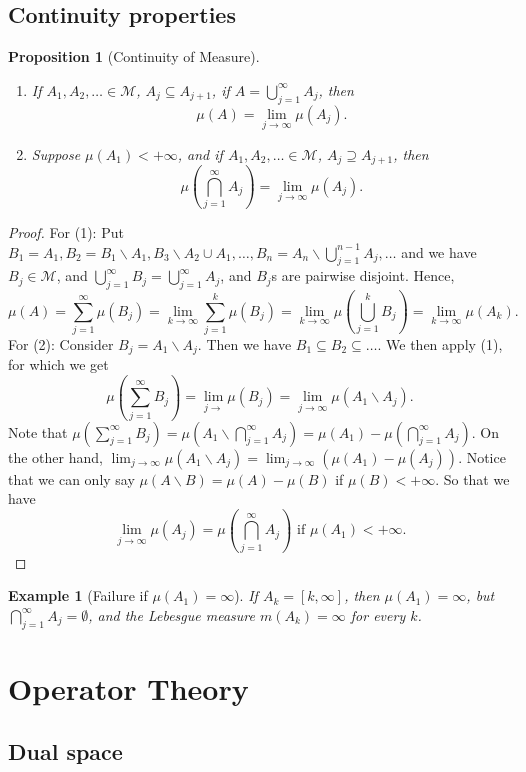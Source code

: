 \documentclass{tufte-handout}
\newtheorem{proposition}{Proposition}[section]
\newtheorem{example}{Example}[section]
\begin{document}
\subsection{Continuity properties}
\begin{proposition}[Continuity of Measure]
    \mbox{}
    \begin{enumerate}
        \item If $A_1, A_2, \dots \in \mathcal{M}$, $A_j \subseteq A_{j+1}$, if $A = \bigcup^{\infty}_{j=1} A_j$, then 
        \[
        \mu(A) = \lim_{j\rightarrow \infty} \mu(A_j).
        \]
        \item  Suppose $\mu(A_1) < +\infty$, and if $A_1, A_2, \dots \in \mathcal{M}$, $A_j \supseteq A_{j+1}$, then 
        \[
        \mu(\bigcap^{\infty}_{j=1} A_j) = \lim_{j\rightarrow \infty} \mu(A_j).
        \]
    \end{enumerate}
\end{proposition}
\begin{proof}
    For (1): Put $B_1=A_1, B_2=B_1\backslash A_1, B_3\backslash A_2\cup A_1, \dots, B_n=A_n\backslash \bigcup^{n-1}_{j=1}A_j,\dots$ and we have $B_j\in \mathcal{M}$, and $\bigcup^{\infty}_{j=1} B_j = \bigcup^{\infty}_{j=1} A_j$, and $B_j$s are pairwise disjoint. Hence,
    \[
    \mu(A) = \sum^{\infty}_{j=1} \mu(B_j) = \lim_{k\rightarrow \infty} \sum_{j=1}^{k}\mu(B_j) = \lim_{k\rightarrow \infty} \mu\left( \bigcup^{k}_{j=1} B_j\right) = \lim_{k\rightarrow \infty} \mu(A_k).
    \]
    For (2): Consider $B_j = A_1\backslash A_j$. Then we have $B_1 \subseteq B_2 \subseteq \dots$. We then apply (1), for which we get
    \[
    \mu\left( \sum_{j=1}^\infty B_j \right) = \lim_{j\rightarrow }\mu(B_j) = \lim_{j\rightarrow \infty} \mu(A_1\backslash A_j).
    \]
    Note that $\mu\left( \sum_{j=1}^\infty B_j \right) =\mu(A_1 \backslash \bigcap_{j=1}^\infty A_j) = \mu(A_1) - \mu(\bigcap_{j=1}^\infty A_j)$. On the other hand, $ \lim_{j\rightarrow \infty} \mu(A_1\backslash A_j)=\lim_{j\rightarrow \infty}(\mu(A_1) - \mu(A_j))$. Notice that we can only say 
    $\mu(A\backslash B) = \mu(A) - \mu(B)$ if $\mu(B)<+\infty$. So that we have
    \[
    \lim_{j\rightarrow \infty} \mu(A_j) = \mu\left(\bigcap^\infty_{j=1} A_j\right) \text{ if } \mu(A_1) < +\infty.
    \]
\end{proof}
\begin{example}[Failure if $\mu(A_1) = \infty$]
    If $A_k=[k,\infty]$, then $\mu(A_1)=\infty$, but $\bigcap^\infty_{j=1} A_j = \emptyset$, and the Lebesgue measure $m(A_k) = \infty$ for every $k$.
\end{example}

\section{Operator Theory}
\subsection{Dual space}




\end{document}
